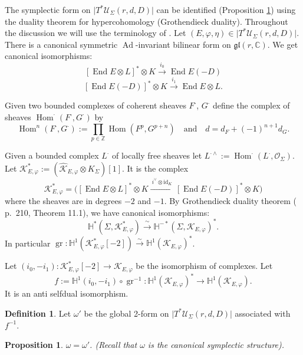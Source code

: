 \documentclass[12pt,a4paper,oneside,english]{smfart}
\newtheorem{prop}[thm]{Proposition}
\theoremstyle{definition}
\newtheorem{defn}[thm]{Definition}
\theoremstyle{remark}
\DeclareMathOperator{\End}{End}
\DeclareMathOperator{\Hom}{Hom}
\DeclareMathOperator{\Ad}{Ad}
\DeclareMathOperator{\gr}{gr}
\newcommand{\cU}{\mathcal{U}}
\newcommand{\cO}{\mathcal{O}}
\newcommand{\KK}{\mathscr{K}}
\newcommand{\HH}{\mathbb{H}}
\newcommand{\tot}[1]{\lvert #1 \rvert}
\begin{document}
The symplectic form on $\tot{T^*\cU_\Sigma(r, d, D)}$ can be identified (Proposition \ref{t7.12}) using the duality theorem for hypercohomology (Grothendieck duality). Throughout the discussion we will use the terminology of \cite{Ha}. Let $(E, \varphi, \eta) \in \tot{T^*\cU_\Sigma(r, d, D)}$. There is a canonical symmetric $\Ad$-invariant bilinear form on $\mathfrak{gl}(r, \mathbb{C})$. We get canonical isomorphisms:
\[
[\End E \otimes L]^* \otimes K \xrightarrow{\ i_0\ } \End E(-D)
\]
\[
[\End E(-D)]^* \otimes K \xrightarrow{\ i_1\ } \End E \otimes L.
\]

Given two bounded complexes of coherent sheaves $F^{\textstyle\cdot}$, $G^{\textstyle\cdot}$ define the complex of sheaves $\Hom^{\textstyle\cdot}(F^{\textstyle\cdot}, G^{\textstyle\cdot})$ by
\[
\Hom^n(F^{\textstyle\cdot}, G^{\textstyle\cdot}) := \prod_{p \in \mathbb{Z}} \Hom(F^p, G^{p+n}) \quad \text{and} \quad d = d_F + (-1)^{n+1} d_G.
\]

Given a bounded complex $L^{\textstyle\cdot}$ of locally free sheaves let $L^{\textstyle\cdot \wedge} := \Hom^{\textstyle\cdot}(L^{\textstyle\cdot}, \cO_\Sigma)$. Let $\KK^*_{E, \varphi} := (\widehat{\KK}_{E, \varphi} \otimes K_\Sigma)[1]$. It is the complex
\[
\KK^*_{E, \varphi} = \bigl([\End E \otimes L]^* \otimes K \xrightarrow{\ i^\vee \otimes \mathrm{id}_K\ } [\End E(-D)]^* \otimes K\bigr)
\]
where the sheaves are in degrees $-2$ and $-1$. By Grothendieck duality theorem (\cite{Ha} p.~210, Theorem 11.1), we have canonical isomorphisms:
\[
\HH^*(\Sigma, \KK^*_{E, \varphi}) \xrightarrow{\ \sim\ } \HH^{-*}(\Sigma, \KK_{E, \varphi})^*.
\]
In particular $\gr \colon \HH^1(\KK^*_{E, \varphi}[-2]) \xrightarrow{\sim} \HH^1(\KK_{E, \varphi})^*$.

Let $(i_0, -i_1) \colon \KK^*_{E, \varphi}[-2] \to \KK_{E, \varphi}$ be the isomorphism of complexes. Let
\[
f := \HH^1(i_0, -i_1) \circ \gr^{-1} \colon \HH^1(\KK_{E, \varphi})^* \to \HH^1(\KK_{E, \varphi}).
\]
It is an anti selfdual isomorphism.

\begin{defn}\label{t7.11}
Let $\omega'$ be the global 2-form on $\tot{T^*\cU_\Sigma(r, d, D)}$ associated with $f^{-1}$.
\end{defn}

\begin{prop}\label{t7.12}
$\omega = \omega'$. (Recall that $\omega$ is the canonical symplectic structure).
\end{prop}
\end{document}
